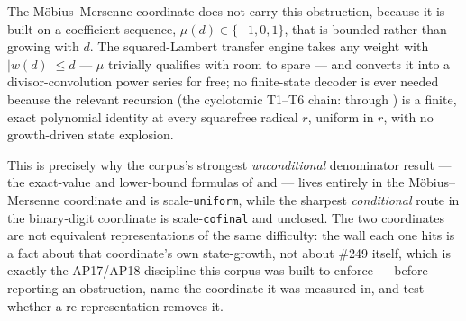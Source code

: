 The M\"obius--Mersenne coordinate does not carry this obstruction, because it is built on a
coefficient sequence, $\mu(d)\in\{-1,0,1\}$, that is bounded rather than growing with $d$. The
squared-Lambert transfer engine
 takes any weight with
$|w(d)|\le d$ — $\mu$ trivially qualifies with room to spare — and converts it into a
divisor-convolution power series for free; no finite-state decoder is ever needed because the
relevant recursion (the cyclotomic T1--T6 chain: 
through ) is a finite,
exact polynomial identity at every squarefree radical $r$, uniform in $r$, with no growth-driven
state explosion.

This is precisely why the corpus's strongest \emph{unconditional} denominator
result — the exact-value and lower-bound formulas of
 and
 — lives
entirely in the M\"obius--Mersenne coordinate and is scale-\texttt{uniform}, while the sharpest
\emph{conditional} route in the binary-digit coordinate is scale-\texttt{cofinal} and unclosed. The
two coordinates are not equivalent representations of the same difficulty: the wall each one hits
is a fact about that coordinate's own state-growth, not about \#249 itself, which is exactly the
AP17/AP18 discipline this corpus was built to enforce — before reporting an obstruction, name the
coordinate it was measured in, and test whether a re-representation removes it.
